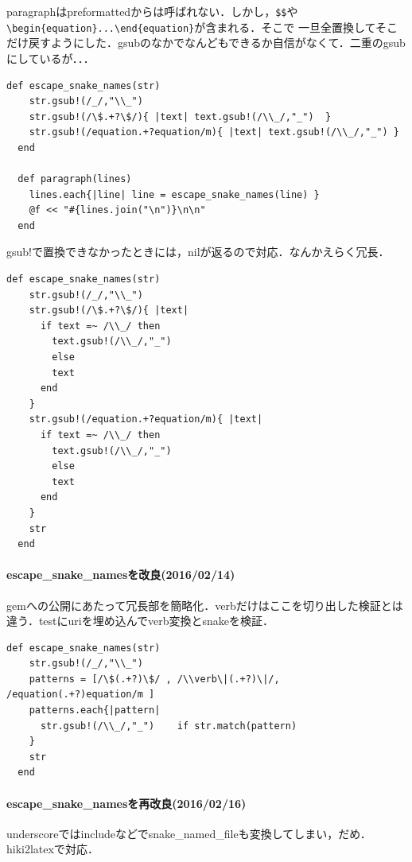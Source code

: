 paragraphはpreformattedからは呼ばれない．しかし，\verb|$$|や\verb|\begin{equation}...\end{equation}|が含まれる．そこで
一旦全置換してそこだけ戻すようにした．gsubのなかでなんどもできるか自信がなくて．二重のgsubにしているが．．．
\begin{lstlisting}[style=customRuby]
  def escape_snake_names(str)
    str.gsub!(/_/,"\\_")
    str.gsub!(/\$.+?\$/){ |text| text.gsub!(/\\_/,"_")  }
    str.gsub!(/equation.+?equation/m){ |text| text.gsub!(/\\_/,"_") }
  end

  def paragraph(lines)
    lines.each{|line| line = escape_snake_names(line) }
    @f << "#{lines.join("\n")}\n\n"
  end
\end{lstlisting}
gsub!で置換できなかったときには，nilが返るので対応．なんかえらく冗長．
\begin{lstlisting}[style=customRuby]
  def escape_snake_names(str)
    str.gsub!(/_/,"\\_")
    str.gsub!(/\$.+?\$/){ |text|
      if text =~ /\\_/ then
        text.gsub!(/\\_/,"_")
        else
        text
      end
    }
    str.gsub!(/equation.+?equation/m){ |text|
      if text =~ /\\_/ then
        text.gsub!(/\\_/,"_")
        else
        text
      end
    }
    str
  end
\end{lstlisting}
\paragraph{escape\_snake\_namesを改良(2016/02/14)}
gemへの公開にあたって冗長部を簡略化．verbだけはここを切り出した検証とは違う．testにuriを埋め込んでverb変換とsnakeを検証．
\begin{lstlisting}[style=customRuby]
  def escape_snake_names(str)
    str.gsub!(/_/,"\\_")
    patterns = [/\$(.+?)\$/ , /\\verb\|(.+?)\|/, /equation(.+?)equation/m ]
    patterns.each{|pattern|
      str.gsub!(/\\_/,"_")    if str.match(pattern)
    }
    str
  end
\end{lstlisting}
\paragraph{escape\_snake\_namesを再改良(2016/02/16)}
underscoreではincludeなどでsnake\_named\_fileも変換してしまい，だめ．hiki2latexで対応．

